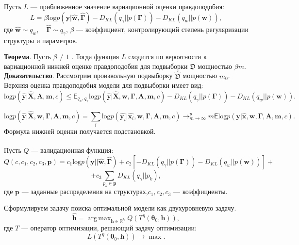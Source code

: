 \documentclass[12pt]{article}
\DeclareMathOperator*{\argmax}{arg\,max}
\begin{document}
Пусть $L$ --- приближенное значение вариационной оценки правдоподобия:
\[
    L = \beta\text{log} p(\mathbf{y}|\hat{\mathbf{w}}, \hat{\boldsymbol{\Gamma}}) - {D_{KL}}(q_\gamma||p(\boldsymbol{\Gamma})) - {D_{KL}}(q_{w}||p(\mathbf{w})),
\]
где $\hat{\mathbf{w}} \sim q_w, \quad \hat{\boldsymbol{\Gamma}} \sim q_\gamma$, $\beta$ --- коэффициент, контролирующий степень регуляризации структуры и параметров.


\textbf{Теорема}. Пусть $\beta \neq 1$ .
Тогда функция $L$ сходится по вероятности к вариационной нижней оценке правдоподобия для подвыборки  $\mathfrak{D}$ 
мощностью $\beta m$.\\
\textbf{Доказательство}. Рассмотрим произвольную подвыборку $\hat{\mathfrak{D}}$ мощностью $m_0$. Верхняя оценка правдоподобия модели для подвыборки имеет вид:
\[
 \text{log} p(\hat{\mathbf{y}}|\hat{\mathbf{X}},\mathbf{A},\mathbf{m}, c)  \leq \mathsf{E}_{q_w,q_\gamma}\text{log} p(\hat{\mathbf{y}}|\hat{\mathbf{X}},\mathbf{w}, \boldsymbol{\Gamma}, \mathbf{A},\mathbf{m}, c) - {D_{KL}}(q_\gamma||p(\boldsymbol{\Gamma})) - {D_{KL}}(q_{w}||p(\mathbf{w})).
\]

\[
\text{log} p(\hat{\mathbf{y}}|\hat{\mathbf{X}},\mathbf{w}, \boldsymbol{\Gamma}, \mathbf{A},\mathbf{m}, c) = \sum_i \text{log} p(\hat{\mathbf{y}_i}|\hat{\mathbf{x}_i},\mathbf{w}, \boldsymbol{\Gamma}, \mathbf{A},\mathbf{m}, c) \to^p_{m \to \infty} m\mathsf{E}\text{log} p(\mathbf{y}|\hat{\mathbf{x}},\mathbf{w}, \boldsymbol{\Gamma}, \mathbf{A},\mathbf{m}, c).
\]
Формула нижней оценки получается подстановкой.
~\\~\\

Пусть $Q$ --- валидационная функция:
\[
    Q(c, c_1, c_2, c_3, \mathbf{p}) = c_1\text{log} p(\mathbf{y}||\hat{\mathbf{w}}, \hat{\boldsymbol{\Gamma}}) + c_2[-{D_{KL}}(q_\gamma||p(\boldsymbol{\Gamma})) - {D_{KL}}(q_{w}||p(\mathbf{w}))] + 
\]
\[
    + c_3\sum_{p_k \in \mathbf{p}}{D_{KL}}(q_\gamma||p_k),
\]
где $\mathbf{p}$ --- заданные распределения на структурах,$c_1,c_2,c_3$ --- коэффициенты.

Сформулируем задачу поиска оптимальной модели как двухуровневую задачу.
\begin{equation}
\label{eq:optim}
	\hat{\mathbf{h}} = \argmax_{\mathbf{h} \in \mathbb{R}^h} Q( T^\eta(\boldsymbol{\theta}_0, \mathbf{h})),
\end{equation}
где $T$ --- оператор оптимизации, решающий задачу оптимизации:
\[
    L(T^\eta(\boldsymbol{\theta}_0, \mathbf{h})) \to \max.
\]
\end{document}
